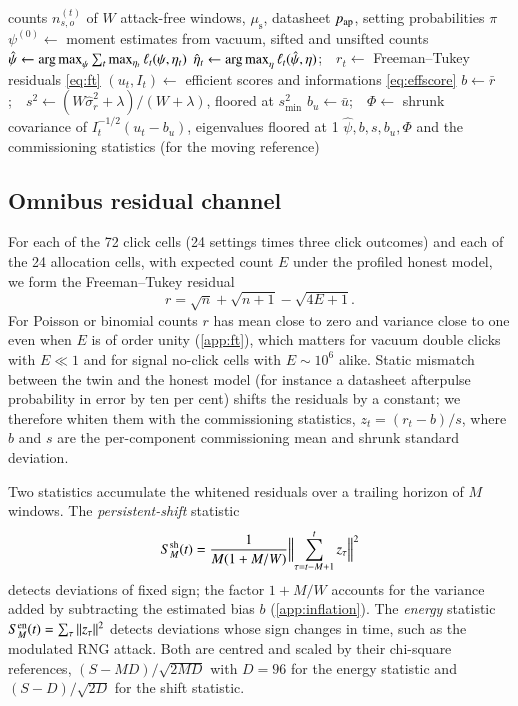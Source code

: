 \begin{algorithm}[t]
\caption{Commissioning of one link}\label{alg:calib}
\begin{algorithmic}[1]
\Require counts $n^{(t)}_{s,o}$ of $W$ attack-free windows, $\mu_\mathrm{s}$, datasheet $p_{\rm ap}$, setting probabilities $\pi$
\State $\psi^{(0)}\gets$ moment estimates from vacuum, sifted and unsifted counts
\State $\hat\psi\gets\operatorname*{arg\,max}_\psi\sum_t\max_{\eta_t}\ell_t(\psi,\eta_t)$ 
  \State $\hat\eta_t\gets\operatorname*{arg\,max}_\eta \ell_t(\hat\psi,\eta)$;\ \ $r_t\gets$ Freeman--Tukey residuals \eqref{eq:ft}
  \State $(u_t,I_t)\gets$ efficient scores and informations \eqref{eq:effscore}
\EndFor
\State $b\gets\bar r$;\ \ $s^2\gets (W\hat\sigma^2_r+\lambda)/(W+\lambda)$, floored at $s_{\min}^2$ 
\State $b_u\gets\bar u$;\ \ $\Phi\gets$ shrunk covariance of $I_t^{-1/2}(u_t-b_u)$, eigenvalues floored at 1 
\State \Return $\hat\psi,b,s,b_u,\Phi$ and the commissioning statistics (for the moving reference)
\end{algorithmic}
\end{algorithm}

\subsection{Omnibus residual channel}\label{sec:omnibus}

For each of the 72 click cells (24 settings times three click outcomes) and each of the 24 allocation cells, with expected count $E$ under the profiled honest model, we form the Freeman--Tukey residual \cite{FreemanTukey1950}
\begin{equation}
r = \sqrt{n}+\sqrt{n+1}-\sqrt{4E+1}. \label{eq:ft}
\end{equation}
For Poisson or binomial counts $r$ has mean close to zero and variance close to one even when $E$ is of order unity (\cref{app:ft}), which matters for vacuum double clicks with $E\ll1$ and for signal no-click cells with $E\sim10^6$ alike. Static mismatch between the twin and the honest model (for instance a datasheet afterpulse probability in error by ten per cent) shifts the residuals by a constant; we therefore whiten them with the commissioning statistics, $z_t=(r_t-b)/s$, where $b$ and $s$ are the per-component commissioning mean and shrunk standard deviation.

Two statistics accumulate the whitened residuals over a trailing horizon of $M$ windows. The \emph{persistent-shift} statistic
\begin{equation}
S^{\rm sh}_M(t)=\frac{1}{M(1+M/W)}\Bigl\Vert\sum_{\tau=t-M+1}^{t}z_\tau\Bigr\Vert^2 \label{eq:shift}
\end{equation}
detects deviations of fixed sign; the factor $1+M/W$ accounts for the variance added by subtracting the estimated bias $b$ (\cref{app:inflation}). The \emph{energy} statistic $S^{\rm en}_M(t)=\sum_\tau\Vert z_\tau\Vert^2$ detects deviations whose sign changes in time, such as the modulated RNG attack. Both are centred and scaled by their chi-square references, $(S-MD)/\sqrt{2MD}$ with $D=96$ for the energy statistic and $(S-D)/\sqrt{2D}$ for the shift statistic.


